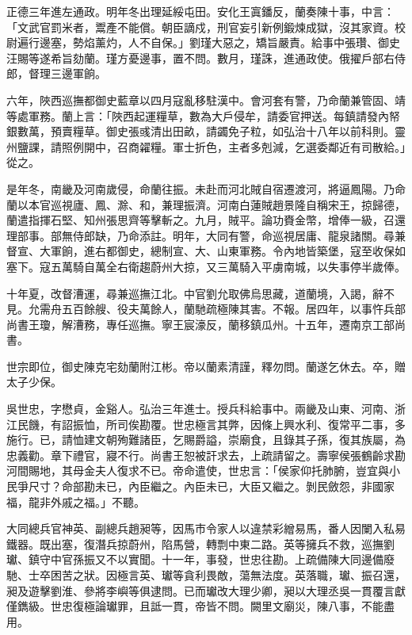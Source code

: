 \begin{pinyinscope}
正德三年進左通政。明年冬出理延綏屯田。安化王寘鐇反，蘭奏陳十事，中言：「文武官罰米者，鬻產不能償。朝臣謫戍，刑官妄引新例鍛煉成獄，沒其家資。校尉遍行邊塞，勢焰薰灼，人不自保。」劉瑾大惡之，矯旨嚴責。給事中張瓚、御史汪賜等遂希旨劾蘭。瑾方憂邊事，置不問。數月，瑾誅，進通政使。俄擢戶部右侍郎，督理三邊軍餉。

六年，陜西巡撫都御史藍章以四月寇亂移駐漢中。會河套有警，乃命蘭兼管固、靖等處軍務。蘭上言：「陜西起運糧草，數為大戶侵牟，請委官押送。每鎮請發內帑銀數萬，預賣糧草。御史張彧清出田畝，請蠲免子粒，如弘治十八年以前科則。靈州鹽課，請照例開中，召商糴糧。軍士折色，主者多剋減，乞選委鄰近有司散給。」從之。

是年冬，南畿及河南歲侵，命蘭往振。未赴而河北賊自宿遷渡河，將逼鳳陽。乃命蘭以本官巡視廬、鳳、滁、和，兼理振濟。河南白蓮賊趙景隆自稱宋王，掠歸德，蘭遣指揮石堅、知州張思齊等擊斬之。九月，賊平。論功賚金幣，增俸一級，召還理部事。部無侍郎缺，乃命添註。明年，大同有警，命巡視居庸、龍泉諸關。尋兼督宣、大軍餉，進右都御史，總制宣、大、山東軍務。令內地皆築堡，寇至收保如塞下。寇五萬騎自萬全右衛趨蔚州大掠，又三萬騎入平虜南城，以失事停半歲俸。

十年夏，改督漕運，尋兼巡撫江北。中官劉允取佛烏思藏，道蘭境，入謁，辭不見。允需舟五百餘艘、役夫萬餘人，蘭馳疏極陳其害。不報。居四年，以事忤兵部尚書王瓊，解漕務，專任巡撫。寧王宸濠反，蘭移鎮瓜州。十五年，遷南京工部尚書。

世宗即位，御史陳克宅劾蘭附江彬。帝以蘭素清謹，釋勿問。蘭遂乞休去。卒，贈太子少保。

吳世忠，字懋貞，金谿人。弘治三年進士。授兵科給事中。兩畿及山東、河南、浙江民饑，有詔振恤，所司俟勘覆。世忠極言其弊，因條上興水利、復常平二事，多施行。已，請恤建文朝殉難諸臣，乞賜爵謚，崇廟食，且錄其子孫，復其族屬，為忠義勸。章下禮官，寢不行。尚書王恕被訐求去，上疏請留之。壽寧侯張鶴齡求勘河間賜地，其母金夫人復求不已。帝命遣使，世忠言：「侯家仰托肺腑，豈宜與小民爭尺寸？命部勘未已，內臣繼之。內臣未已，大臣又繼之。剝民斂怨，非國家福，龍非外戚之福。」不聽。

大同總兵官神英、副總兵趙昶等，因馬市令家人以違禁彩繒易馬，番人因闌入私易鐵器。既出塞，復潛兵掠蔚州，陷馬營，轉剽中東二路。英等擁兵不救，巡撫劉瓛、鎮守中官孫振又不以實聞。十一年，事發，世忠往勘。上疏備陳大同邊備廢馳、士卒困苦之狀。因極言英、瓛等貪利畏敵，蕩無法度。英落職，瓛、振召還，昶及遊擊劉淮、參將李嶼等俱逮問。已而瓛改大理少卿，昶以大理丞吳一貫覆言獻僅鐫級。世忠復極論瓛罪，且詆一貫，帝皆不問。闕里文廟災，陳八事，不能盡用。


\end{pinyinscope}
